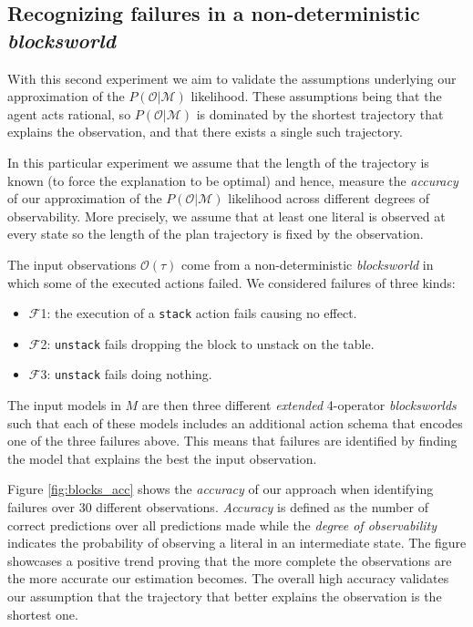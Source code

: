 \documentclass[letterpaper]{article} %
\begin{document}
\subsection{Recognizing failures in a non-deterministic {\em blocksworld}}
With this second experiment we aim to validate the assumptions underlying our approximation of the $P(\mathcal{O}|\mathcal{M})$ likelihood. These assumptions being that the agent acts rational, so $P(\mathcal{O}|\mathcal{M})$ is dominated by the shortest trajectory that explains the observation, and that there exists a single such trajectory.

In this particular experiment we assume that the length of the trajectory is known (to force the explanation to be optimal) and hence, measure the {\em  accuracy} of our approximation of the $P(\mathcal{O}|\mathcal{M})$ likelihood across different degrees of observability. More precisely, we assume that at least one literal is observed at every state so the length of the plan trajectory is fixed by the observation. 

The input observations $\mathcal{O}(\tau)$ come from a non-deterministic {\em blocksworld} in which some of the executed actions failed. We considered failures of three kinds:
\begin{itemize}
	\item $\mathcal{F}$1: the execution of a {\tt\small stack} action fails causing no effect.
	\item $\mathcal{F}$2: {\tt\small unstack} fails dropping the block to unstack on the table.        
	\item $\mathcal{F}$3: {\tt\small unstack} fails doing nothing.
\end{itemize}
The input models in $M$ are then three different {\em extended} 4-operator {\em blocksworlds} such that each of these models includes an additional action schema that encodes one of the three failures above. This means that failures are identified by finding the model that explains the best the input observation. 

Figure \ref{fig:blocks_acc} shows the {\em accuracy} of our approach when identifying failures over 30 different observations. {\em Accuracy} is defined as the number of correct predictions over all predictions made while the {\em degree of observability} indicates the probability of observing a literal in an intermediate state. The figure showcases a positive trend proving that the more complete the observations are the more accurate our estimation becomes. The overall high accuracy validates our assumption that the trajectory that better explains the observation is the shortest one. %
\end{document}

